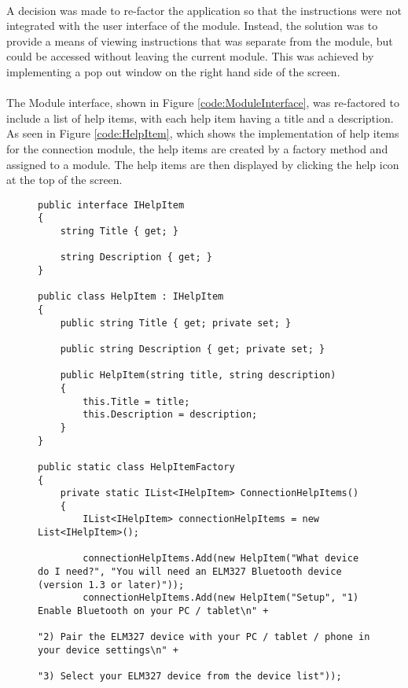 {		\paragraph{}{
		A decision was made to re-factor the application so that the instructions were not integrated with the user interface of the module. Instead, the solution was to provide a means of viewing instructions that was separate from the module, but could be accessed without leaving the current module. This was achieved by implementing a pop out window on the right hand side of the screen.
		}
		\paragraph{}{
		The Module interface, shown in Figure \ref{code:ModuleInterface}, was re-factored to include a list of help items, with each help item having a title and a description. As seen in Figure \ref{code:HelpItem}, which shows the implementation of help items for the connection module, the help items are created by a factory method and assigned to a module. The help items are then displayed by clicking the help icon at the top of the screen.
		}
		
		\begin{figure}[h]
			\begin{lstlisting}
public interface IHelpItem
{
    string Title { get; }

	string Description { get; }
}

public class HelpItem : IHelpItem
{
	public string Title { get; private set; }

	public string Description { get; private set; }

	public HelpItem(string title, string description)
	{
		this.Title = title;
		this.Description = description;
	}
}

public static class HelpItemFactory
{
	private static IList<IHelpItem> ConnectionHelpItems()
	{
    	IList<IHelpItem> connectionHelpItems = new List<IHelpItem>();

		connectionHelpItems.Add(new HelpItem("What device do I need?", "You will need an ELM327 Bluetooth device (version 1.3 or later)"));
        connectionHelpItems.Add(new HelpItem("Setup", "1) Enable Bluetooth on your PC / tablet\n" +
                                                          "2) Pair the ELM327 device with your PC / tablet / phone in your device settings\n" +
                                                          "3) Select your ELM327 device from the device list"));


\end{lstlisting}
\end{figure}}
